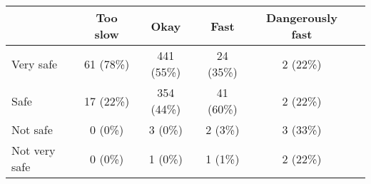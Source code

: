 \begin{tabular}{l c|c|c|c|c} \hline  & Too slow & Okay & Fast & Dangerously fast \\ 
\hline Very safe & 61 (78\%) & 441 (55\%) & 24 (35\%) & 2 (22\%) \\ 
  Safe & 17 (22\%) & 354 (44\%) & 41 (60\%) & 2 (22\%) \\ 
  Not safe & 0 (0\%) & 3 (0\%) & 2 (3\%) & 3 (33\%) \\ 
  Not very safe & 0 (0\%) & 1 (0\%) & 1 (1\%) & 2 (22\%) \\ 
 \hline \end{tabular}